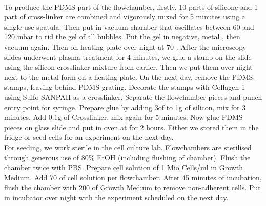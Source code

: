 \\
To produce the PDMS part of the flowchamber, firstly, 10 parts of silicone  and 1 part of cross-linker  are combined and vigorously mixed for 5 minutes using a single-use spatula. Then put in vacuum chamber that oscillates between 60 and 120 mbar to rid the gel of all bubbles. Put the gel in negative, metal , then vacuum again. Then on heating plate  over night at 70 \degC{}. After the microscopy slides underwent plasma treatment for 4 minutes, we glue a stamp on the slide using the silicon-crosslinker-mixture from earlier. Then we put them over night next to the metal form on a heating plate. On the next day, remove the PDMS-stamps, leaving behind PDMS grating. Decorate the stamps with Collagen-1  using Sulfo-SANPAH as a crosslinker. Separate the flowchamber pieces and punch entry point for syringe. Prepare glue by adding 3\mul of  to 1g of silicon, mix for 3 minutes. Add 0.1g of Crosslinker, mix again for 5 minutes. Now glue PDMS-pieces on glass slide and put in oven at  for 2 hours. Either we stored them in the fridge or seed cells for an experiment on the next day.\\
For seeding, we work sterile in the cell culture lab. Flowchambers are sterilised through generous use of 80\% EtOH (including flushing of chamber). Flush the chamber twice with PBS. Prepare cell solution of 1 Mio Cells/ml in Growth Medium. Add 70 \mul{} of cell solution per flowchamber. After 45 minutes of incubation, flush the chamber with 200\mul{} of Growth Medium to remove non-adherent cells. Put in incubator over night with the experiment scheduled on the next day.


